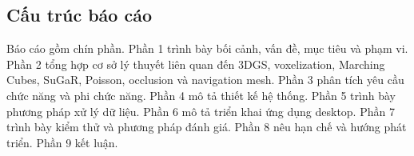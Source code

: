 \subsection{Cấu trúc báo cáo}

Báo cáo gồm chín phần. Phần 1 trình bày bối cảnh, vấn đề, mục tiêu và phạm vi. Phần 2 tổng hợp cơ sở lý thuyết liên quan đến 3DGS, voxelization, Marching Cubes, SuGaR, Poisson, occlusion và navigation mesh. Phần 3 phân tích yêu cầu chức năng và phi chức năng. Phần 4 mô tả thiết kế hệ thống. Phần 5 trình bày phương pháp xử lý dữ liệu. Phần 6 mô tả triển khai ứng dụng desktop. Phần 7 trình bày kiểm thử và phương pháp đánh giá. Phần 8 nêu hạn chế và hướng phát triển. Phần 9 kết luận.
